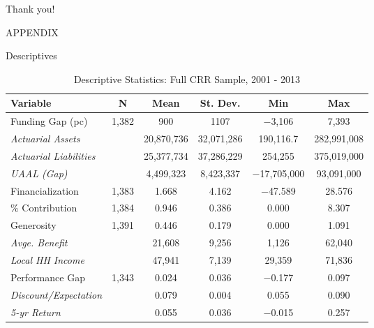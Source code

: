 \documentclass{beamer}
\begin{document}
\begin{frame}
\textmd{Thank you!}
\end{frame}

\begin{frame}
\textmd{APPENDIX}
\end{frame}

\begin{frame}{\textmd{Descriptives}}
\begin{table}
\begin{tiny}
  \caption{Descriptive Statistics: Full CRR Sample, 2001 - 2013} 
\begin{center} 
\begin{tabular}{@{\extracolsep{5pt}}lccccc} 
\hline 
Variable & \multicolumn{1}{c}{N} & \multicolumn{1}{c}{Mean} & \multicolumn{1}{c}{St. Dev.} & \multicolumn{1}{c}{Min} & \multicolumn{1}{c}{Max} \\
\hline  
Funding Gap (pc) & 1,382 & 900 & 1107 & $-$3,106 & 7,393 \\ 
\hspace*{0.25cm} \emph{Actuarial Assets} &  & 20,870,736 & 32,071,286 & 190,116.7 & 282,991,008 \\ 
\hspace*{0.25cm} \emph{Actuarial Liabilities} &  & 25,377,734 & 37,286,229 & 254,255 & 375,019,000 \\ 
\hspace*{0.25cm} \emph{UAAL (Gap)} &  & 4,499,323 & 8,423,337 & $-$17,705,000 & 93,091,000 \\ 
Financialization & 1,383 & 1.668 & 4.162 & $-$47.589 & 28.576 \\ 
\% Contribution & 1,384 & 0.946 & 0.386 & 0.000 & 8.307 \\ 
Generosity & 1,391 & 0.446 & 0.179 & 0.000 & 1.091 \\ 
\hspace*{0.25cm} \emph{Avge. Benefit} &  & 21,608 & 9,256 & 1,126 & 62,040 \\ 
\hspace*{0.25cm} \emph{Local HH Income} &  & 47,941 & 7,139 & 29,359 & 71,836 \\ 
Performance Gap & 1,343 & 0.024 & 0.036 & $-$0.177 & 0.097 \\ 
\hspace*{0.25cm} \emph{Discount/Expectation} &  & 0.079 & 0.004 & 0.055 & 0.090 \\ 
\hspace*{0.25cm} \emph{5-yr Return} &  & 0.055 & 0.036 & $-$0.015 & 0.257 \\ 

\end{tabular}
\end{center}
\end{tiny}
\end{table}
\end{frame}
\end{document}
